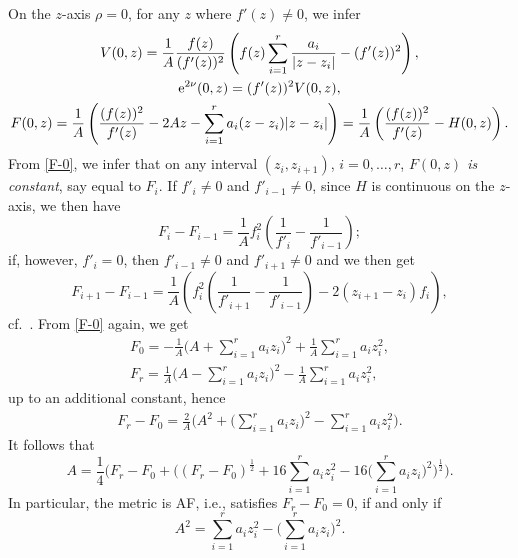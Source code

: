 \documentclass[pdftex]{sigma}
\numberwithin{equation}{section}
\begin{document}
On the $z$-axis $\rho = 0$, for any $z$ where $f'(z) \neq 0$, we infer
\begin{gather} V (0, z) = \frac{1}{A} \frac{f (z)}{(f' (z))^2} \left(f (z) \sum _{i = 1}^r \frac{a_i}{|z - z _i|} - (f' (z))^2\right),\label{V-0}\\
{\rm e}^{2 \nu} (0, z) = (f' (z)) ^2 V(0, z), \nonumber\\ %
F (0, z) = \frac{1}{A} \left(\frac{(f (z))^2}{f' (z)} - 2 A z - \sum _{i = 1}^r a _i (z - z_i) |z - z _i|\right) = \frac{1}{A} \left(\frac{(f (z))^2}{f' (z)} - H (0, z)\right). \label{F-0}
 \end{gather}
From \eqref{F-0}, we infer that on any interval $(z_i, z_{i + 1})$, $i = 0, \dots, r$, {\it $F (0, z)$ is constant}, say equal to $F _i$. If $f' _i \neq 0$ and $f' _{i - 1} \neq 0$, since $H$ is continuous on the $z$-axis, we then have
\[%
 F_i - F_{i - 1} = \frac{1}{A} f_i ^2 \left(\frac{1}{f'_i} - \frac{1}{f'_{i - 1}}\right); \]
if, however, $f'_i = 0$, then $f'_{i - 1} \neq 0$ and $f'_{i + 1} \neq 0$ and we then get
\[
F_{i + 1} - F_{i - 1} = \frac{1}{A} \left(f_i ^2 \left(\frac{1}{f'_{i + 1}} - \frac{1}{f'_{i - 1}}\right) - 2 (z _{i + 1} - z _i) f_i\right), \]
cf.\ \cite[Propsition 7]{BG}.
From \eqref{F-0} again, we get
\begin{gather*}F _0 = - \frac{1}{A} \bigg(A + \sum _{i = 1} ^r a _i z _i\bigg) ^2 + \frac{1}{A } \sum _{i = 1} ^r a _i z _i ^2, \\
F _r = \frac{1}{A} \bigg(A - \sum _{i = 1} ^r a _i z _i\bigg) ^2 - \frac{1}{A } \sum _{i = 1} ^r a _i z _i ^2, \end{gather*}
up to an additional constant, hence
\begin{gather} \label{Fr-F0} F_r - F_0 = \frac{2}{A} \bigg(A ^ 2 + \bigg(\sum _{i = 1} ^r a _i z _i\bigg) ^2 - \sum _{i = 1} ^r a_i z _i ^2\bigg). \end{gather}
It follows that
\[ A = \frac{1}{4} \bigg(F_r - F_0 + \bigg((F_r - F_0) ^{\frac{1}{2}} + 16 \sum _{i = 1} ^r a _i z _i ^2 - 16 \bigg(\sum _{i = 1} ^r a _i z _i\bigg) ^2\bigg) ^{\frac{1}{2}}\bigg). \]
In particular, the metric is AF, i.e., satisfies $F_r - F _0 = 0$, if and only if
\[
 A ^2 = \sum _{i = 1}^r a _i z _i ^2 - \bigg(\sum _{i = 1} ^r a _i z _i\bigg) ^2. \]
\end{document}
